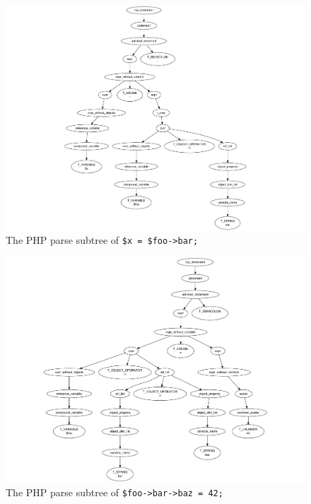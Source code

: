 \begin{figure}[htb]
  \begin{center}
    \includegraphics[scale=.85, trim=55mm 0mm 0mm 0mm]{images/one-level-field-access-right}
    \caption{The PHP parse subtree of \texttt{\$x = \$foo->bar;}}
    \label{fig:one-level-field-access-right}
  \end{center}
\end{figure}

\begin{figure}[htb]
  \begin{center}
    \includegraphics[scale=.7, trim=35mm 0mm 0mm 0mm]{images/multi-level-field-access-left}
    \caption{The PHP parse subtree of \texttt{\$foo->bar->baz = 42;}}
    \label{fig:multi-level-field-access-left}
  \end{center}
\end{figure}


